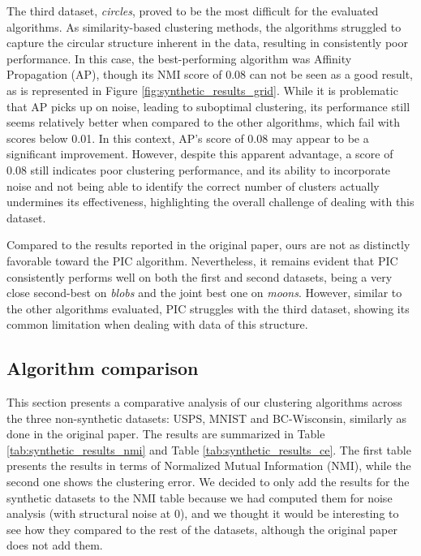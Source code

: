 \documentclass[
	10pt,
	parskip=half-,	
	paper=a4,
	english
	]{scrartcl}
\begin{document}
The third dataset, \textit{circles}, proved to be the most difficult for the evaluated algorithms. As similarity-based clustering methods, the algorithms struggled to capture the circular structure inherent in the data, resulting in consistently poor performance. In this case, the best-performing algorithm was Affinity Propagation (AP), though its NMI score of 0.08 can not be seen as a good result, as is represented in Figure \ref{fig:synthetic_results_grid}. While it is problematic that AP picks up on noise, leading to suboptimal clustering, its performance still seems relatively better when compared to the other algorithms, which fail with scores below 0.01. In this context, AP's score of 0.08 may appear to be a significant improvement. However, despite this apparent advantage, a score of 0.08 still indicates poor clustering performance, and its ability to incorporate noise and not being able to identify the correct number of clusters actually undermines its effectiveness, highlighting the overall challenge of dealing with this dataset.

Compared to the results reported in the original paper, ours are not as distinctly favorable toward the PIC algorithm. Nevertheless, it remains evident that PIC consistently performs well on both the first and second datasets, being a very close second-best on \textit{blobs} and the joint best one on \textit{moons}. However, similar to the other algorithms evaluated, PIC struggles with the third dataset, showing its common limitation when dealing with data of this structure.

\subsection{Algorithm comparison}

This section presents a comparative analysis of our clustering algorithms across the three non-synthetic datasets: USPS, MNIST and BC-Wisconsin, similarly as done in the original paper. The results are summarized in Table \ref{tab:synthetic_results_nmi} and Table \ref{tab:synthetic_results_ce}. The first table presents the results in terms of Normalized Mutual Information (NMI), while the second one shows the clustering error. We decided to only add the results for the synthetic datasets to the NMI table because we had computed them for noise analysis (with structural noise at 0), and we thought it would be interesting to see how they compared to the rest of the datasets, although the original paper does not add them.
\end{document}
